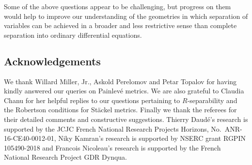 \documentclass[pdftex]{sigma}
\numberwithin{equation}{section}
\begin{document}
Some of the above questions appear to be challenging, but progress on them would help to improve our understanding of the geometries in which separation of variables can be achieved in a broader and less restrictive sense than complete separation into ordinary differential equations.

\subsection*{Acknowledgements}
We thank Willard Miller, Jr., Askold Perelomov and Petar Topalov for having kindly answered our queries on Painlev\'e metrics. We are also grateful to Claudia Chanu for her helpful replies to our questions pertaining to $R$-separability and the Robertson conditions for St\"ackel metrics. Finally we thank the referees for their detailed comments and constructive suggestions. Thierry Daud\'e's research is supported by the JCJC French National Research Projects Horizons, No.~ANR-16-CE40-0012-01, Niky Kamran's research is supported by NSERC grant RGPIN 105490-2018 and Francois Nicoleau's research is supported by the French National Research Project GDR Dynqua.
\end{document}
